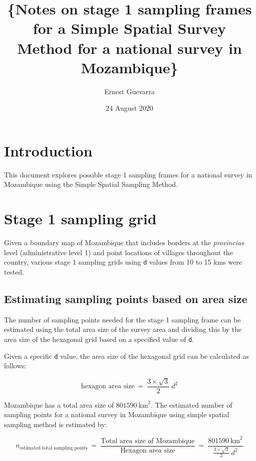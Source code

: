 \documentclass[
  12pt,
  a4paper]{article}
\title{\vspace{8cm} \LARGE\{Notes on stage 1 sampling frames for a Simple Spatial Survey Method for a national survey in Mozambique\}}
\author{Ernest Guevarra}
\date{24 August 2020}
\begin{document}
\maketitle

\newpage

\newpage

\hypertarget{introduction}{%
\section{Introduction}\label{introduction}}

This document explores possible stage 1 sampling frames for a national survey in Mozambique using the Simple Spatial Sampling Method.

\hypertarget{stage-1-sampling-grid}{%
\section{Stage 1 sampling grid}\label{stage-1-sampling-grid}}

Given a boundary map of Mozambique that includes borders at the \emph{provincias} level (administrative level 1) and point locations of villages throughout the country, various stage 1 sampling grids using \texttt{d} values from 10 to 15 kms were tested.

\hypertarget{estimating-sampling-points-based-on-area-size}{%
\subsection{Estimating sampling points based on area size}\label{estimating-sampling-points-based-on-area-size}}

The number of sampling points needed for the stage 1 sampling frame can be estimated using the total area size of the survey area and dividing this by the area size of the hexagonal grid based on a specified value of \texttt{d}.

Given a specific \texttt{d} value, the area size of the hexagonal grid can be calculated as follows:

\[ \text{hexagon area size} ~ = ~ \frac{3 \times \sqrt{3}}{2} ~ d ^ 2  \]

Mozambique has a total area size of \(801590 ~ \text{km} ^ 2\). The estimated number of sampling points for a national survey in Mozambique using simple spatial sampling method is estimated by:

\[ n_\text{estimated total sampling points} ~ = ~ \frac{\text{Total area size of Mozambique}}{\text{Hexagon area size}} ~ = ~ \frac{801590 ~ \text{km} ^ 2}{\frac{3 \times \sqrt{3}}{2} ~ d ^ 2} \]
\end{document}
